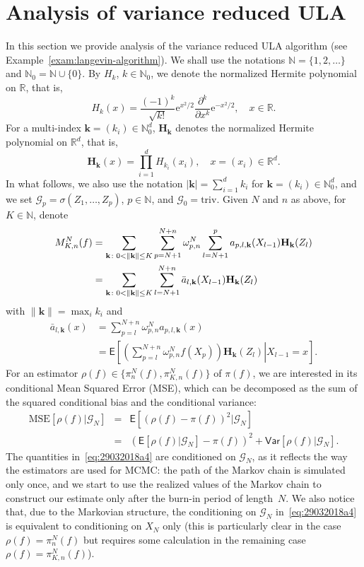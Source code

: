 \documentclass[article]{elsarticle}
\def\rme{\mathrm{e}}
\begin{document}
\section{Analysis of variance reduced ULA}
\label{sec:ula_analysis}
In this section we provide   analysis of the variance reduced ULA  algorithm (see Example~\ref{exam:langevin-algorithm}).
We shall use the notations $\mathbb N=\{1,2,\ldots\}$
and $\mathbb N_0=\mathbb N\cup\{0\}$.
By $H_k$, $k\in\mathbb N_0$,
we denote the normalized Hermite polynomial on $\mathbb R$, that is,
$$
H_k(x)=\frac{(-1)^k}{\sqrt{k!}}\rme^{x^2/2}\frac{\partial^k}{\partial x^k}\rme^{-x^2/2},
\quad x\in\mathbb R.
$$
For a multi-index $\mathbf{k}=(k_i)\in\mathbb N_0^d$,
$\mathbf{H}_\mathbf{k}$ denotes the normalized Hermite polynomial on $\mathbb R^d$, that is,
$$
\mathbf{H}_\mathbf{k}(x)=\prod_{i=1}^d H_{k_i}(x_i),\quad x=(x_i)\in\mathbb R^d.
$$
In what follows, we also use the notation
$|\mathbf{k}|=\sum_{i=1}^d k_i$ for $\mathbf{k}=(k_i)\in\mathbb N_0^d$,
and we set $\mathcal G_p=\sigma(Z_1,\ldots,Z_p)$, $p\in\mathbb N$, and $\mathcal G_0=\mathrm{triv}$.
Given $N$ and $n$ as above, for $K\in\mathbb N$, denote
\begin{align}
M_{K,n}^N(f) & =\sum_{\mathbf k\colon 0<\|\mathbf{k}\|\le K}\sum_{p=N+1}^{N+n}\omega_{p,n}^{N}\sum_{l=N+1}^{p}a_{p,l,\mathbf{k}}(X_{l-1})\mathbf{H}_\mathbf{k}(Z_{l})
\label{eq:29032018a5}\\
&=\sum_{\mathbf k\colon 0<\|\mathbf{k}\|\le K}\sum_{l=N+1}^{N+n}\bar{a}_{l,\mathbf{k}}(X_{l-1})\mathbf{H}_\mathbf{k}(Z_{l})
\notag
\end{align}
with \(\|\mathbf{k}\|=\max_{i} k_i\) and
\begin{align*}
\bar{a}_{l,\mathbf{k}}(x)
& =\sum_{p=l}^{N+n}\omega_{p,n}^{N}a_{p,l,\mathbf{k}}(x)\\
& =\mathsf{E}\left[\left.\left(\sum_{p=l}^{N+n}\omega_{p,n}^{N}f(X_{p})\right)\mathbf{H}_\mathbf{k}\left(Z_{l}\right)\right|X_{l-1}=x\right].
\end{align*}
For an estimator $\rho(f)\in\{\pi_n^N(f),\pi_{K,n}^N(f)\}$
of $\pi(f)$, we are interested in its conditional
Mean Squared Error (MSE),
which can be decomposed as the sum of the squared conditional bias
and the conditional variance:
\begin{eqnarray}\label{eq:29032018a4}
\mathrm{MSE}\left[\rho(f)|\mathcal G_N\right]
&=&\mathsf{E}\left[(\rho(f)-\pi(f))^2|\mathcal G_N\right]
\\
\nonumber
&=&\left(\mathsf{E}[\rho(f)|\mathcal G_N]-\pi(f)\right)^2
+\mathsf{Var}\left[\rho(f)|\mathcal G_N\right].
\end{eqnarray}
The quantities in~\eqref{eq:29032018a4}
are conditioned on $\mathcal G_N$,
as it reflects the way the estimators are used for MCMC:
the path of the Markov chain is simulated only once,
and we start to use the realized values
of the Markov chain to construct
our estimate only after the burn-in period of length~$N$.
We also notice that, due to the Markovian structure,
the conditioning on $\mathcal G_N$
in~\eqref{eq:29032018a4}
is equivalent to conditioning on $X_N$ only
(this is particularly clear in the case $\rho(f)=\pi_n^N(f)$
but requires some calculation
in the remaining case $\rho(f)=\pi_{K,n}^N(f)$).
\end{document}
